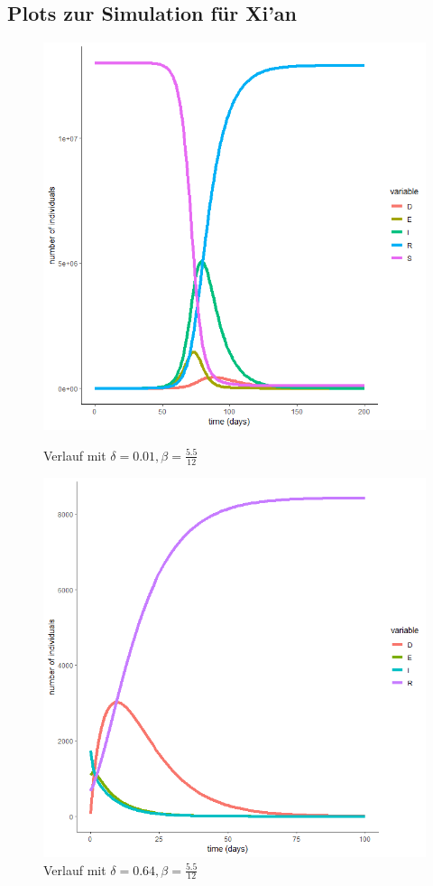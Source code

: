 \documentclass{scrartcl}
\begin{document}
\subsection*{Plots zur Simulation für Xi'an}
	\begin{figure}[h]	
        	\centering
        	\begin{minipage}[b]{0.45\textwidth}
		\includegraphics[scale=0.35]{delta=0,01,beta_unveraendert,alles.png}
		\caption{Verlauf mit $\delta = 0.01, \beta = \frac{5.5}{12}$}
		\end{minipage}
 		\hfill
 		\begin{minipage}[b]{0.45\textwidth}
		\includegraphics[scale=0.35]{delta=0,64,beta_unveraendert,ohne_s.png}
		\caption{Verlauf mit $\delta = 0.64, \beta = \frac{5.5}{12}$}
		\end{minipage}
	\end{figure}
\end{document}
